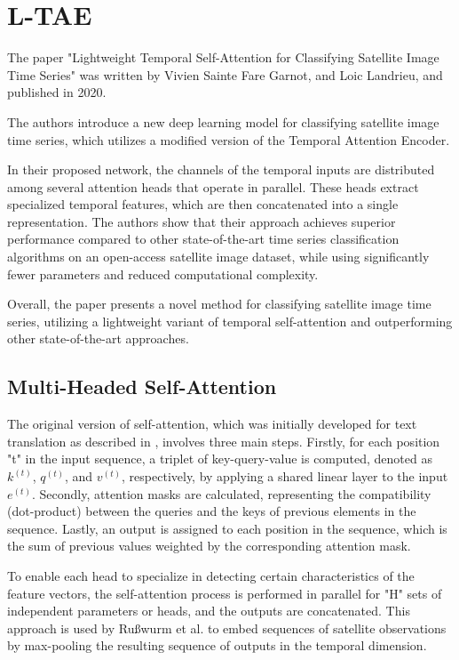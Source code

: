 \section{L-TAE}
The paper "Lightweight Temporal Self-Attention for Classifying Satellite Image Time Series" \cite{LTAE} was written by Vivien Sainte Fare Garnot, and Loic Landrieu, and published in 2020.

The authors introduce a new deep learning model for classifying satellite image time series, which utilizes a modified version of the Temporal Attention Encoder.

In their proposed network, the channels of the temporal inputs are distributed among several attention heads that operate in parallel. These heads extract specialized temporal features, which are then concatenated into a single representation. The authors show that their approach achieves superior performance compared to other state-of-the-art time series classification algorithms on an open-access satellite image dataset, while using significantly fewer parameters and reduced computational complexity.

Overall, the paper presents a novel method for classifying satellite image time series, utilizing a lightweight variant of temporal self-attention and outperforming other state-of-the-art approaches.

\subsection{Multi-Headed Self-Attention}

The original version of self-attention, which was initially developed for text translation as described in \cite{vaswani}, involves three main steps.
Firstly, for each position "t" in the input sequence, a triplet of key-query-value is computed, denoted as $k^{(t)}$, $q^{(t)}$, and $v^{(t)}$, respectively, by applying a shared linear layer to the input $e^{(t)}$.
Secondly, attention masks are calculated, representing the compatibility (dot-product) between the queries and the keys of previous elements in the sequence. 
Lastly, an output is assigned to each position in the sequence, which is the sum of previous values weighted by the corresponding attention mask.

To enable each head to specialize in detecting certain characteristics of the feature vectors, the self-attention process is performed in parallel for "H" sets of independent parameters or heads, and the outputs are concatenated.
This approach is used by Rußwurm et al. \cite{russwurm2019self} to embed sequences of satellite observations by max-pooling the resulting sequence of outputs in the temporal dimension.

